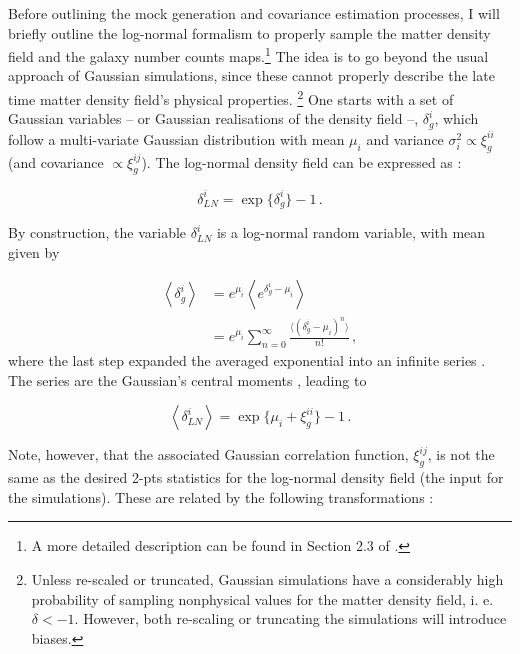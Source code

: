 \qquad Before outlining the mock generation and covariance estimation processes, I will briefly outline the log-normal formalism to properly sample the matter density field and the galaxy number counts maps.\footnote{A more detailed description can be found in Section 2.3 of \cite{LoureiroMestrado}.} The idea is to go beyond the usual approach of Gaussian simulations, since these cannot properly describe the late time matter density field's physical properties. \footnote{Unless re-scaled or truncated, Gaussian simulations have a considerably high probability of sampling nonphysical values for the matter density field, i. e. $\delta < -1$. However, both re-scaling or truncating the simulations will introduce biases.} One starts with a set of Gaussian variables -- or Gaussian realisations of the density field --, $\delta^i_g$, which follow a multi-variate Gaussian distribution with mean $\mu_i$ and variance $\sigma^2_i \propto \xi_g^{ii}$ (and covariance $\propto \xi_g^{ij}$). The log-normal density field can be expressed as \citep{LoureiroMestrado, Flask2016}:

\begin{equation}
    \delta_{LN}^i = \exp \{ \delta^i_g \} - 1 \, .
\end{equation}

By construction, the variable $\delta_{LN}^i$ is a log-normal random variable, with mean given by

\begin{align}
    \left\langle \delta^i_g \right\rangle & = e^{\mu_i}\left\langle e^{\delta^i_g - \mu_i} \right\rangle \\
    & = e^{\mu_i}\sum_{n=0}^{\infty}\frac{\langle (\delta^i_g - \mu_i)^n \rangle}{n!}\, ,
\end{align}
where the last step expanded the averaged exponential into an infinite series \citep{1991-ColesJones,Flask2016}. The series are the Gaussian's central moments \citep{Flask2016}, leading to

\begin{equation}
    \left\langle \delta_{LN}^i \right\rangle = \exp \{ \mu_i + \xi^{ii}_g \} - 1 \, .
\end{equation}

\qquad Note, however, that the associated Gaussian correlation function, $\xi^{ij}_g$, is not the same as the desired 2-pts statistics for the log-normal density field (the input for the simulations). These are related by the following transformations \citep{1991-ColesJones,LoureiroMestrado}:

